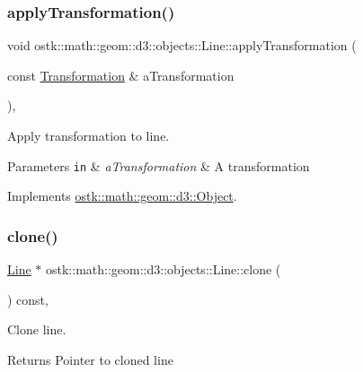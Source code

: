 \subsubsection{\texorpdfstring{apply\+Transformation()}{applyTransformation()}}
{\footnotesize\ttfamily void ostk\+::math\+::geom\+::d3\+::objects\+::\+Line\+::apply\+Transformation (\begin{DoxyParamCaption}\item[{const \hyperlink{classostk_1_1math_1_1geom_1_1d3_1_1_transformation}{Transformation} \&}]{a\+Transformation }\end{DoxyParamCaption})\hspace{0.3cm}{\ttfamily [override]}, {\ttfamily [virtual]}}



Apply transformation to line. 


\begin{DoxyParams}[1]{Parameters}
\mbox{\tt in}  & {\em a\+Transformation} & A transformation \\
\hline
\end{DoxyParams}


Implements \hyperlink{classostk_1_1math_1_1geom_1_1d3_1_1_object_ae9194dd6d2bb4df09292ffc84dccdb1d}{ostk\+::math\+::geom\+::d3\+::\+Object}.

\mbox{\label{classostk_1_1math_1_1geom_1_1d3_1_1objects_1_1_line_aaf6fc08cf6b690b88c52d112052ce226}} 
\subsubsection{\texorpdfstring{clone()}{clone()}}
{\footnotesize\ttfamily \hyperlink{classostk_1_1math_1_1geom_1_1d3_1_1objects_1_1_line}{Line} $\ast$ ostk\+::math\+::geom\+::d3\+::objects\+::\+Line\+::clone (\begin{DoxyParamCaption}{ }\end{DoxyParamCaption}) const\hspace{0.3cm}{\ttfamily [override]}, {\ttfamily [virtual]}}



Clone line. 

\begin{DoxyReturn}{Returns}
Pointer to cloned line 
\end{DoxyReturn}


